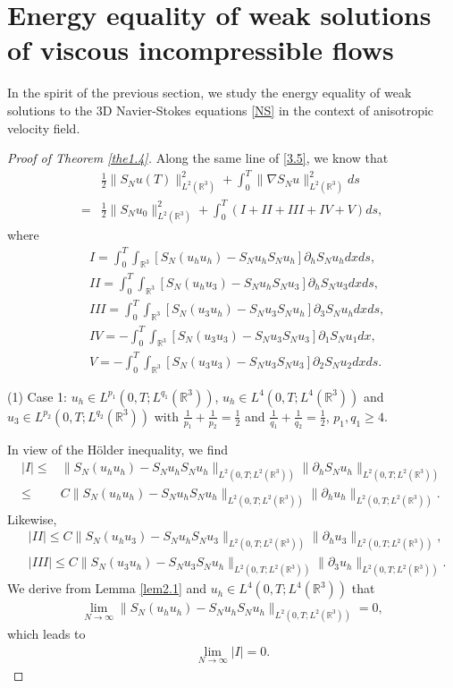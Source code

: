 \documentclass[11pt]{article}
\theoremstyle{plain}\newtheorem{definition}{Definition}[section]
\theoremstyle{definition}\newtheorem{theorem}{Theorem}[section]
\theoremstyle{plain}\newtheorem{lemma}[theorem]{Lemma}
\theoremstyle{plain}\newtheorem{coro}[theorem]{Corollary}
\theoremstyle{plain}\newtheorem{prop}[theorem]{Proposition}
\theoremstyle{remark}\newtheorem{remark}{Remark}[section]
\newcommand{\be}{\begin{equation}}
\newcommand{\ee}{\end{equation}}
\newcommand{\ba}{\begin{aligned}}
\newcommand{\ea}{\end{aligned}}
\newcommand{\f}{\frac}
\numberwithin{equation}{section}
\begin{document}
  \section{Energy equality of weak solutions of   viscous incompressible flows}
In the spirit of the previous section, we  study the energy equality of weak solutions to the 3D Navier-Stokes equations \eqref{NS} in the context of anisotropic velocity field.
\begin{proof}[Proof of Theorem \ref{the1.4}]
Along the same line of \eqref{3.5}, we know that
\be\label{4.1}\ba
&\f12\|S_{N}u(T)\|_{L^{2}(\mathbb{R}^{3})}^{2}+\int_{0}^{T}\|\nabla S_{N}u\|_{L^{2}(\mathbb{R}^{3})}^{2}ds \\=&\f12\|S_{N}u_{0}\|_{L^{2}(\mathbb{R}^{3})}^{2}+\int_{0}^{T}(I+II+III+IV+V)ds,
\ea\ee
where
 $$\ba
 &I=  \int_{0}^{T}\int_{\mathbb{R}^{3}} [S_{N}(u_{h}u_{h} )-S_{N} u_{h}S_{N}u_{h} ]\partial_{h} S_{N}u_{h} dxds, \\
& II=   \int_{0}^{T}\int_{\mathbb{R}^{3}} [S_{N}(u_{h}u_{3} )-S_{N} u_{h}S_{N}u_{3} ]\partial_{h} S_{N}u_{3} dxds, \\
 &III= \int_{0}^{T} \int_{\mathbb{R}^{3}} [S_{N}(u_{3}u_{h} )-S_{N} u_{3}S_{N} u_{h} ]\partial_{3} S_{N}u_{h} dxds,
\\
&IV =-\int_{0}^{T} \int_{\mathbb{R}^{3}} [S_{N}(u_{3}u_{3} )-S_{N} u_{3}S_{N}u_{3}  ] \partial_{1} S_{N}u_{1} dx,
 \\
 & V = -\int_{0}^{T}\int_{\mathbb{R}^{3}} [S_{N}(u_{3}u_{3} )-S_{N} u_{3}S_{N}u_{3}  ]  \partial_{2}S_{N}u_{2} dxds.
\ea$$

(1) Case 1: $u_{h}\in L^{p_{1}}(0,T;L^{q_{1}}(\mathbb{R}^{3}))$, $u_{h}\in L^{4}(0,T;L^{4}(\mathbb{R}^{3}))$ and $u_{3}\in L^{p_{2}}(0,T;L^{q_{2}}(\mathbb{R}^{3}))$ with
$\f{1}{p_{1}}+\f{1}{p_{2}}=\f12$ and $\f{1}{q_{1}}+\f{1}{q_{2}}=\f12$, $p_{1}, q_{1}\geq4$.

 In view of the H\"older inequality, we find
$$\ba
|I|\leq& \|S_{N}(u_{h}u_{h} )-S_{N} u_{h}S_{N}u_{h}\|_{L^{2}(0,T;L^{2}(\mathbb{R}^{3}))}\|\partial_{h} S_{N}u_{h}\|_{L^{2}(0,T;L^{2}(\mathbb{R}^{3}))}\\
\leq& C\|S_{N}(u_{h}u_{h} )-S_{N} u_{h}S_{N}u_{h}\|_{L^{2}(0,T;L^{2}(\mathbb{R}^{3}))}\|\partial_{h} u_{h}\|_{L^{2}(0,T;L^{2}(\mathbb{R}^{3}))}.
\ea$$
Likewise,
\be\ba
&|II|\leq C  \|S_{N}(u_{h}u_{3} )-S_{N} u_{h}S_{N}u_{3}\|_{L^{2}(0,T;L^{2}(\mathbb{R}^{3}))}\|\partial_{h} u_{3}\|_{L^{2}(0,T;L^{2}(\mathbb{R}^{3}))},\\
&|III|\leq C\|S_{N}(u_{3}u_{h} )-S_{N} u_{3}S_{N} u_{h}\|_{L^{2}(0,T;L^{2}(\mathbb{R}^{3}))}\|\partial_{3} u_{h}\|_{L^{2}(0,T;L^{2}(\mathbb{R}^{3}))}.
\ea\ee
We derive from Lemma \ref{lem2.1} and $u_{h}\in L^{4}(0,T;L^{4}(\mathbb{R}^{3}))$
that
\be\ba\label{4.4}
\lim_{N\rightarrow\infty}
\|S_{N}(u_{h}u_{h} )-S_{N} u_{h}S_{N}u_{h}\|_{L^{2}(0,T;L^{2}(\mathbb{R}^{3}))}=0,
\ea\ee
which leads to
\be\ba\label{4.5}
\lim_{N\rightarrow\infty}|I|=0.
\ea\ee


\end{proof}
\end{document}
